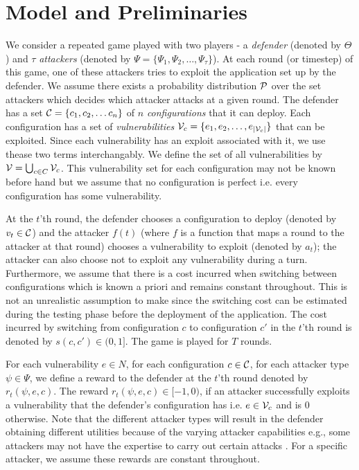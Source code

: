 \section{Model and Preliminaries}\label{sec:model}
We consider a repeated game played with two players - a {\em defender} (denoted by $\Theta$) and $\tau$ {\em attackers} (denoted by $ \Psi = \{\Psi_1, \Psi_2, \dots, \Psi_\tau\}$). At each round (or timestep) of this game, one of these attackers tries to exploit the application set up by the defender. We assume there exists a probability distribution $\cal P$ over the set attackers which decides which attacker attacks at a given round. The defender has a set $\cal C = \{c_1, c_2, \dots c_n\}$ of $n$ {\em configurations} that it can deploy. Each configuration has a set of {\em vulnerabilities} $\cal V_c = \{e_1, e_2, \dots, e_{|\cal V_c|}\}$ that can be exploited. Since each vulnerability has an exploit associated with it, we use thease two terms interchangably. We define the set of all vulnerabilities by  $\cal V = \bigcup_{c \in C} \cal V_c$. This vulnerability set for each configuration may not be known before hand but we assume that no configuration is perfect i.e. every configuration has some vulnerability. 

At the $t$'th round, the defender chooses a configuration to deploy (denoted by $v_t \in \cal C$) and the attacker $f(t)$ (where $f$ is a function that maps a round to the attacker at that round) chooses a vulnerability to exploit (denoted by $a_t$); the attacker can also choose not to exploit any vulnerability during a turn. Furthermore, we assume that there is a cost incurred when switching between configurations which is known a priori and remains constant throughout. This is not an unrealistic assumption to make since the switching cost can be estimated during the testing phase before the deployment of the application. The cost incurred by switching from configuration $c$ to configuration $c'$ in the $t$'th round is denoted by $s(c, c') \in (0,1]$. The game is played for $T$ rounds. 

For each vulnerability $e \in N$, for each configuration $c \in \cal C$, for each attacker type $\psi \in \Psi$, we define a reward to the defender at the $t$'th round denoted by $r_t(\psi, e, c)$. The reward $r_t(\psi, e, c) \in [-1, 0)$, if an attacker successfully exploits a vulnerability that the defender's configuration has i.e. $e \in \cal V_c$ and is $0$ otherwise. Note that the different attacker types will result in the defender obtaining different utilities because of the varying attacker capabilities e.g., some attackers may not have the expertise to carry out certain attacks \citep{sailik2016webappmtd}. For a specific attacker, we assume these rewards are constant throughout.


